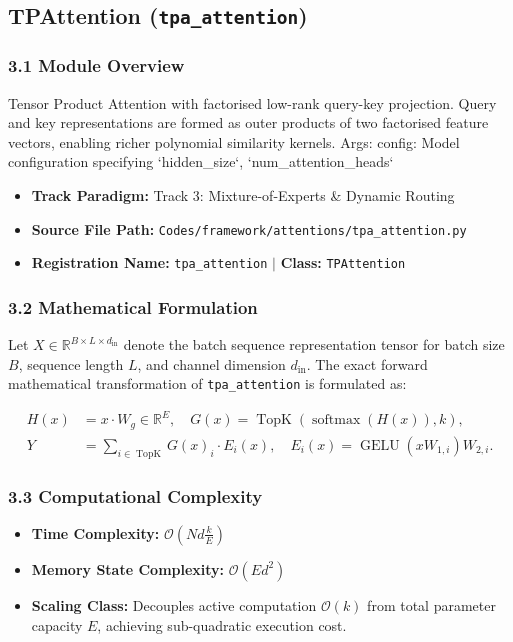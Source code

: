 \subsection{TPAttention (\texttt{tpa\_attention})}
\label{sec:app_module_tpa\_attention}

\subsubsection*{3.1 Module Overview}
Tensor Product Attention with factorised low-rank query-key projection.  Query and key representations are formed as outer products of two factorised feature vectors, enabling richer polynomial similarity kernels.  Args:     config: Model configuration specifying `hidden\_size`, `num\_attention\_heads`
\begin{itemize}
    \item \textbf{Track Paradigm:} Track 3: Mixture-of-Experts & Dynamic Routing
    \item \textbf{Source File Path:} \texttt{Codes/framework/attentions/tpa\_attention.py}
    \item \textbf{Registration Name:} \texttt{tpa\_attention} $\mid$ \textbf{Class:} \texttt{TPAttention}
\end{itemize}

\subsubsection*{3.2 Mathematical Formulation}
Let $X \in \mathbb{R}^{B \times L \times d_{\text{in}}}$ denote the batch sequence representation tensor for batch size $B$, sequence length $L$, and channel dimension $d_{\text{in}}$. The exact forward mathematical transformation of \texttt{tpa\_attention} is formulated as:

\begin{align}
H(x) &= x \cdot W_g \in \mathbb{R}^{E}, \quad G(x) = \operatorname{TopK}\left(\operatorname{softmax}(H(x)), k\right), \\
Y &= \sum_{i \in \operatorname{TopK}} G(x)_i \cdot E_i(x), \quad E_i(x) = \operatorname{GELU}(x W_{1, i}) W_{2, i}.
\end{align}


\subsubsection*{3.3 Computational Complexity}
\begin{itemize}
    \item \textbf{Time Complexity:} $\mathcal{O}(N d \frac{k}{E})$
    \item \textbf{Memory State Complexity:} $\mathcal{O}(E d^2)$
    \item \textbf{Scaling Class:} Decouples active computation $\mathcal{O}(k)$ from total parameter capacity $E$, achieving sub-quadratic execution cost.
\end{itemize}

